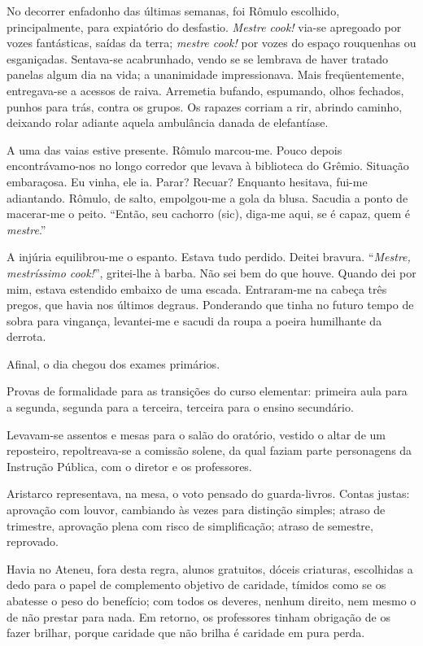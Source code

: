 No decorrer enfadonho das últimas semanas,
foi Rômulo escolhido, principalmente, para expiatório do desfastio.
\textit{Mestre cook!} via{}-se apregoado por vozes fantásticas, saídas da terra;
\textit{mestre cook!} por vozes do espaço rouquenhas ou esganiçadas.
Sentava{}-se acabrunhado, vendo se se lembrava de haver tratado panelas
algum dia na vida; a unanimidade impressionava. Mais freqüentemente,
entregava{}-se a acessos de raiva. Arremetia bufando, espumando, olhos
fechados, punhos para trás, contra os grupos. Os rapazes corriam a rir,
abrindo caminho, deixando rolar adiante aquela ambulância danada de
elefantíase. 

A uma das vaias estive presente. Rômulo marcou{}-me. Pouco
depois encontrávamo{}-nos no longo corredor que levava à biblioteca do
Grêmio. Situação embaraçosa. Eu vinha, ele ia. Parar? Recuar? Enquanto
hesitava, fui{}-me adiantando. Rômulo, de salto, empolgou{}-me a gola
da blusa. Sacudia a ponto de macerar{}-me o peito. ``Então, seu cachorro
(sic), diga{}-me aqui, se é capaz, quem é \textit{mestre}.'' 

A injúria equilibrou{}-me o espanto. Estava tudo perdido. Deitei bravura.
``\textit{Mestre, mestríssimo cook!}'', gritei{}-lhe à barba. Não sei bem do que
houve. Quando dei por mim, estava estendido embaixo de uma escada.
Entraram{}-me na cabeça três pregos, que havia nos últimos degraus.
Ponderando que tinha no futuro tempo de sobra para vingança,
levantei{}-me e sacudi da roupa a poeira humilhante da derrota. 

Afinal, o dia chegou dos exames primários. 

Provas de formalidade para as
transições do curso elementar: primeira aula para a segunda, segunda
para a terceira, terceira para o ensino secundário. 

Levavam{}-se assentos e mesas para o salão do oratório, vestido o altar de um
reposteiro, repoltreava{}-se a comissão solene, da qual faziam parte
personagens da Instrução Pública, com o diretor e os professores.

Aristarco representava, na mesa, o voto pensado do guarda{}-livros.
Contas justas: aprovação com louvor, cambiando às vezes para distinção
simples; atraso de trimestre, aprovação plena com risco de
simplificação; atraso de semestre, reprovado. 

Havia no Ateneu, fora
desta regra, alunos gratuitos, dóceis criaturas, escolhidas a dedo para
o papel de complemento objetivo de caridade, tímidos como se os
abatesse o peso do benefício; com todos os deveres, nenhum direito, nem
mesmo o de não prestar para nada. Em retorno, os professores tinham
obrigação de os fazer brilhar, porque caridade que não brilha é
caridade em pura perda. 

